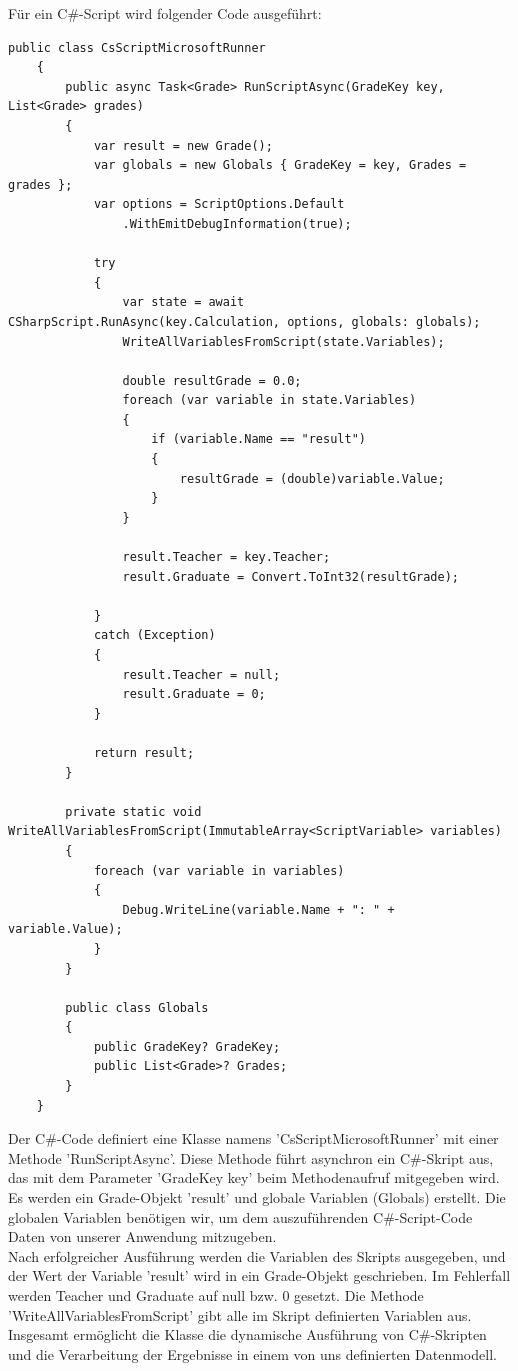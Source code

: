 Für ein C\#-Script wird folgender Code ausgeführt:

\begin{lstlisting}[language={[Sharp]C},caption=Code for C\#-Scripting,label=lst:impl:csc]
    public class CsScriptMicrosoftRunner
    {
        public async Task<Grade> RunScriptAsync(GradeKey key, List<Grade> grades)
        {
            var result = new Grade();
            var globals = new Globals { GradeKey = key, Grades = grades };
            var options = ScriptOptions.Default
                .WithEmitDebugInformation(true);

            try
            {
                var state = await CSharpScript.RunAsync(key.Calculation, options, globals: globals);
                WriteAllVariablesFromScript(state.Variables);

                double resultGrade = 0.0;
                foreach (var variable in state.Variables)
                {
                    if (variable.Name == "result")
                    {
                        resultGrade = (double)variable.Value;
                    }
                }

                result.Teacher = key.Teacher;
                result.Graduate = Convert.ToInt32(resultGrade);

            }
            catch (Exception)
            {
                result.Teacher = null;
                result.Graduate = 0;
            }

            return result;
        }

        private static void WriteAllVariablesFromScript(ImmutableArray<ScriptVariable> variables)
        {
            foreach (var variable in variables)
            {
                Debug.WriteLine(variable.Name + ": " + variable.Value);
            }
        }

        public class Globals
        {
            public GradeKey? GradeKey;
            public List<Grade>? Grades;
        }
    }
\end{lstlisting}

Der C\#-Code definiert eine Klasse namens 'CsScriptMicrosoftRunner' mit einer Methode 'RunScriptAsync'. 
Diese Methode führt asynchron ein C\#-Skript aus, das mit dem Parameter 'GradeKey key' beim Methodenaufruf 
mitgegeben wird. 
\\
Es werden ein Grade-Objekt 'result' und globale Variablen (Globals) erstellt. Die globalen Variablen 
benötigen wir, um dem auszuführenden C\#-Script-Code Daten von unserer Anwendung mitzugeben. 
\\
Nach erfolgreicher Ausführung werden die Variablen des Skripts ausgegeben, und der Wert der Variable 
'result' wird in ein Grade-Objekt geschrieben. Im Fehlerfall werden Teacher und Graduate auf null bzw. 0 
gesetzt. Die Methode 'WriteAllVariablesFromScript' gibt alle im Skript definierten Variablen aus. 
\\
Insgesamt ermöglicht die Klasse die dynamische Ausführung von C\#-Skripten und die Verarbeitung der 
Ergebnisse in einem von uns definierten Datenmodell.



